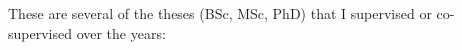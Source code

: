 


\newcommand{\Bern}{U. Bern}
\newcommand{\Groningen}{U. Groningen}

\newcommand{\super}[5]{\item #1, {\bf #2} {\footnotesize(#3)}\\ #4 #5}
\newcommand{\inprogr}{in progress, }
\newcommand{\cosup}{co-supervised with }
\newcommand{\inprogrcosup}{{\footnotesize(in progress, co-supervised with O. Nierstrasz)}}
\newcommand{\detail}[1]{{\footnotesize(#1)}}


\newcommand{\yr}[1]{(#1)}

These are several of the theses (BSc, MSc, PhD) that I supervised or co-supervised over the years:

